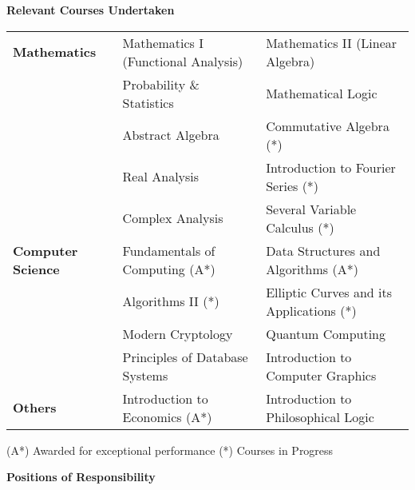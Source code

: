 \documentclass[letterpaper,11pt]{article}
\begin{document}
{\begin{itemize}
\end{itemize}

\Large{\textbf{Relevant Courses Undertaken}}
\small

\begin{tabular}{p{4cm} p{7cm} p{7cm}}
\\
\textbf{ Mathematics} & Mathematics I (Functional Analysis) & Mathematics II (Linear Algebra) \vspace{4pt}\\
& Probability \& Statistics & Mathematical Logic\vspace{4pt}\\
& Abstract Algebra & Commutative Algebra (*)\vspace{4pt}\\
& Real Analysis & Introduction to Fourier Series (*)\vspace{4pt}\\
& Complex Analysis & Several Variable Calculus (*)\vspace{9pt}\\

\textbf{ Computer Science} & Fundamentals of Computing (A*) & Data Structures and Algorithms (A*)\vspace{4pt}\\
& Algorithms II (*) & Elliptic Curves and its Applications (*)\vspace{4pt}\\
& Modern Cryptology & Quantum Computing\vspace{4pt}\\
& Principles of Database Systems & Introduction to Computer Graphics\vspace{9pt}\\

\textbf{ Others} & Introduction to Economics (A*) & Introduction to Philosophical Logic\vspace{9pt}\\
\end{tabular}

\footnotesize{\hspace*{0.5in}(A*) Awarded for exceptional performance
\hspace{1.5in}  (*) Courses in Progress\\

\vspace{10pt}

\Large{\textbf{Positions of Responsibility}}
\small

}}
\end{document}
